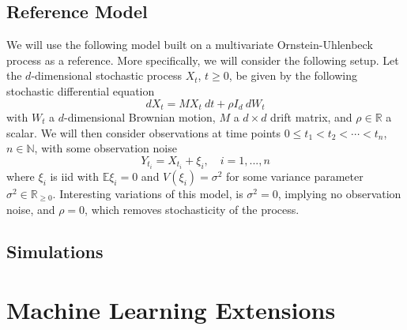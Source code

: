 \documentclass[11pt, a4paper]{memoir}
\theoremstyle{plain}
\theoremstyle{definition}
\begin{document}
\section{Reference Model}
We will use the following model built on a multivariate Ornstein-Uhlenbeck process as a reference. More specifically, we will consider the following setup. Let the $d$-dimensional stochastic process $X_t$, $t\geq 0$, be given by the following stochastic differential equation
$$dX_t=M X_t\ dt+\rho I_d\ dW_t$$
with $W_t$ a $d$-dimensional  Brownian motion, $M$ a $d\times d$ drift matrix, and $\rho\in \mathbb{R}$ a scalar. We will then consider observations at time points $0\leq t_1<t_2<\cdots <t_n$, $n\in \mathbb{N}$, with some observation noise
$$Y_{t_i}=X_{t_i}+\xi_i,\quad i=1,...,n$$
where $\xi_i$ is iid with $\mathbb{E} \xi_i=0$ and $V(\xi_i)=\sigma^2$ for some variance parameter $\sigma^2\in \mathbb{R}_{\geq 0}$. Interesting variations of this model, is $\sigma^2=0$, implying no observation noise, and $\rho=0$, which removes stochasticity of the process.

\section{Simulations}
 

\chapter{Machine Learning Extensions}


\end{document}

